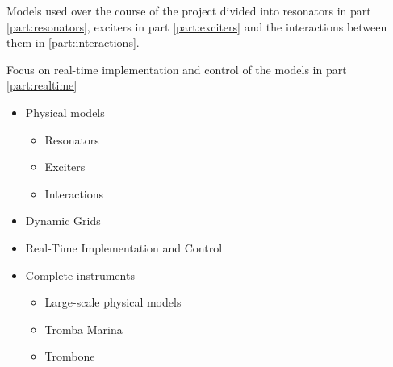 Models used over the course of the project divided into resonators in part \ref{part:resonators}, exciters in part \ref{part:exciters} and the interactions between them in \ref{part:interactions}.

Focus on real-time implementation and control of the models in part \ref{part:realtime}
\begin{itemize}
    \item Physical models
    \begin{itemize}
        \item Resonators
        \item Exciters
        \item Interactions
    \end{itemize}
    \item Dynamic Grids
    \item Real-Time Implementation and Control
    \item Complete instruments
    \begin{itemize}
        \item Large-scale physical models
        \item Tromba Marina
        \item Trombone
    \end{itemize}
\end{itemize}